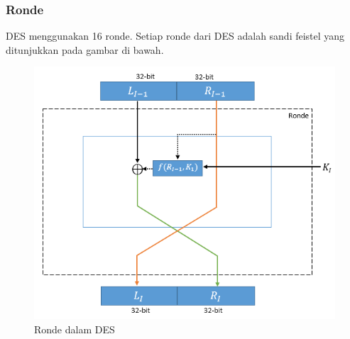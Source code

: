 \subsubsection{Ronde}
DES menggunakan 16 ronde. Setiap ronde dari DES adalah sandi feistel yang ditunjukkan pada gambar di bawah.

\begin{figure}[h]
\includegraphics[scale=0.5]{Gambar/round}
\centering
\caption{Ronde dalam DES}
\end{figure}

